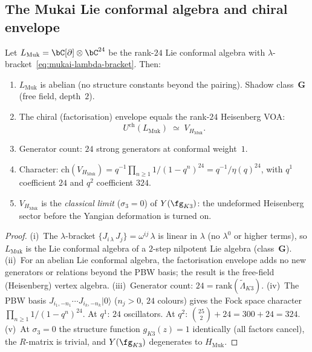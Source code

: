 \subsection{The Mukai Lie conformal algebra and chiral envelope}
\label{subsec:mukai-lie-conformal}

\begin{proposition}
\label{prop:chiral-envelope-mukai}
Let $L_{\mathrm{Muk}} = \bC[\partial] \otimes \bC^{24}$ be the rank-$24$ Lie conformal algebra with $\lambda$-bracket~\eqref{eq:mukai-lambda-bracket}. Then:
\begin{enumerate}[label=\textup{(\roman*)}]
 \item $L_{\mathrm{Muk}}$ is abelian (no structure constants beyond the pairing). Shadow class~$\mathbf{G}$ (free field, depth~$2$).
 \item The chiral (factorisation) envelope equals the rank-$24$ Heisenberg VOA:
 \begin{equation}\label{eq:chiral-envelope-mukai}
 U^{\mathrm{ch}}(L_{\mathrm{Muk}}) \;\simeq\; V_{H_{\mathrm{Muk}}}.
 \end{equation}
 \item Generator count: $24$ strong generators at conformal weight~$1$.
 \item Character:
 $\mathrm{ch}(V_{H_{\mathrm{Muk}}}) = q^{-1} \prod_{n \geq 1} 1/(1 - q^n)^{24} = q^{-1}/\eta(q)^{24}$, with $q^1$ coefficient $24$ and $q^2$ coefficient $324$.
 \item $V_{H_{\mathrm{Muk}}}$ is the \emph{classical limit} ($\sigma_3 = 0$) of $Y(\fg_{K3})$: the undeformed Heisenberg sector before the Yangian deformation is turned on.
\end{enumerate}
\end{proposition}

\begin{proof}
(i)~The $\lambda$-bracket $\{J_{i\,\lambda}\, J_j\} = \omega^{ij}\, \lambda$ is linear in $\lambda$ (no $\lambda^0$ or higher terms), so $L_{\mathrm{Muk}}$ is the Lie conformal algebra of a $2$-step nilpotent Lie algebra (class~$\mathbf{G}$). (ii)~For an abelian Lie conformal algebra, the factorisation envelope adds no new generators or relations beyond the PBW basis; the result is the free-field (Heisenberg) vertex algebra. (iii)~Generator count: $24 = \mathrm{rank}(\widetilde{\Lambda}_{K3})$. (iv)~The PBW basis $J_{i_1,-n_1} \cdots J_{i_k,-n_k} |0\rangle$ ($n_j > 0$, $24$ colours) gives the Fock space character $\prod_{n \geq 1} 1/(1-q^n)^{24}$. At $q^1$: $24$ oscillators. At $q^2$: $\binom{25}{2} + 24 = 300 + 24 = 324$. (v)~At $\sigma_3 = 0$ the structure function $g_{K3}(z) = 1$ identically (all factors cancel), the $R$-matrix is trivial, and $Y(\fg_{K3})$ degenerates to $H_{\mathrm{Muk}}$.
\end{proof}


